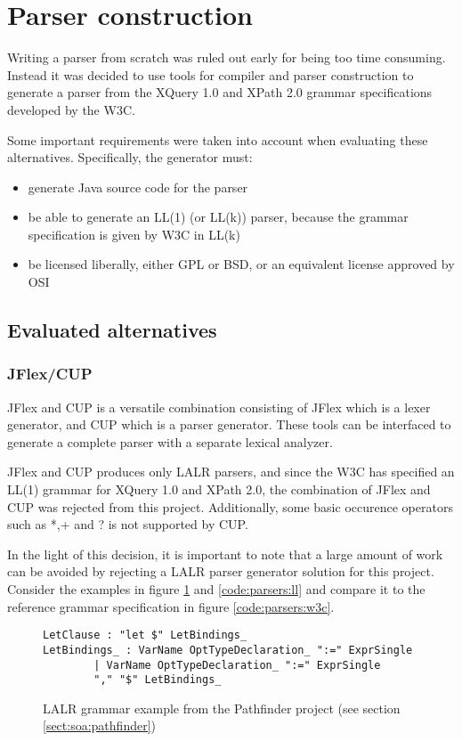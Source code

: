 \section{Parser construction}
Writing a parser from scratch was ruled out early for being too time consuming.
Instead it was decided to use tools for compiler and parser construction to
generate a parser from the XQuery 1.0 and XPath 2.0 grammar  
specifications\cite{w3c01} developed by the W3C.

Some important requirements were taken into account when evaluating these
alternatives. Specifically, the generator must:
\begin{itemize}
  \item generate Java source code for the parser
  \item be able to generate an LL(1) (or LL(k)) parser, because the grammar  
  specification is given by W3C in LL(k)
  \item be licensed liberally, either GPL or BSD, or an equivalent license
  approved by OSI
\end{itemize}

\subsection{Evaluated alternatives}
\label{sect:method:alternatives}
\subsubsection{JFlex/CUP}
JFlex and CUP is a versatile combination consisting of JFlex which is a lexer
generator, and CUP which is a parser generator. These tools can be interfaced to
generate a complete parser with a separate lexical analyzer.

JFlex and CUP produces only LALR parsers, and since the W3C has specified an
LL(1) grammar for XQuery 1.0 and XPath 2.0, the combination of JFlex and CUP was
rejected from this project. Additionally, some basic occurence operators such as
*,+ and ? is not supported by CUP.

In the light of this decision, it is important to note that a large amount of
work can be avoided by rejecting a LALR parser generator solution for this
project. Consider the examples in figure \ref{code:parsers:lalr} and
\ref{code:parsers:ll} and compare it to the reference grammar specification in
figure \ref{code:parsers:w3c}.

\begin{figure}[h!]
\begin{verbatim}
LetClause : "let $" LetBindings_
LetBindings_ : VarName OptTypeDeclaration_ ":=" ExprSingle
        | VarName OptTypeDeclaration_ ":=" ExprSingle
        "," "$" LetBindings_
\end{verbatim}
\caption[LALR grammar example]{LALR grammar example from the Pathfinder project
(see section \ref{sect:soa:pathfinder})}
\label{code:parsers:lalr}
\end{figure}

